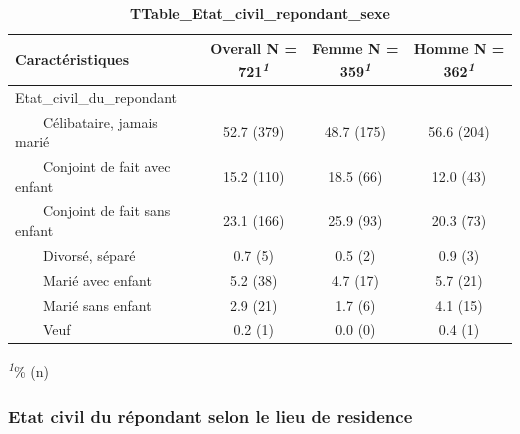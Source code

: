 \documentclass[
]{article}
\begin{document}
\newpage
\begin{table}[!t]
\caption{\label{tab:unnamed-chunk-27}\textbf{TTable\_Etat\_civil\_repondant\_sexe}} 
\fontsize{12.0pt}{14.4pt}\selectfont
\begin{tabular*}{\linewidth}{@{\extracolsep{\fill}}lccc}
\toprule
\textbf{Caractéristiques} & \textbf{Overall}  N = 721\textsuperscript{\textit{1}} & \textbf{Femme}  N = 359\textsuperscript{\textit{1}} & \textbf{Homme}  N = 362\textsuperscript{\textit{1}} \\ 
\midrule\addlinespace[2.5pt]
Etat\_civil\_du\_repondant &  &  &  \\ 
    Célibataire, jamais marié & 52.7 (379) & 48.7 (175) & 56.6 (204) \\ 
    Conjoint de fait avec enfant & 15.2 (110) & 18.5 (66) & 12.0 (43) \\ 
    Conjoint de fait sans enfant & 23.1 (166) & 25.9 (93) & 20.3 (73) \\ 
    Divorsé, séparé & 0.7 (5) & 0.5 (2) & 0.9 (3) \\ 
    Marié avec enfant & 5.2 (38) & 4.7 (17) & 5.7 (21) \\ 
    Marié sans enfant & 2.9 (21) & 1.7 (6) & 4.1 (15) \\ 
    Veuf & 0.2 (1) & 0.0 (0) & 0.4 (1) \\ 
\bottomrule
\end{tabular*}
\begin{minipage}{\linewidth}
\textsuperscript{\textit{1}}\% (n)\\
\end{minipage}
\end{table}

\vspace{2cm}

\hypertarget{etat-civil-du-ruxe9pondant-selon-le-lieu-de-residence}{%
\subsubsection{Etat civil du répondant selon le lieu de
residence}\label{etat-civil-du-ruxe9pondant-selon-le-lieu-de-residence}}
\end{document}
